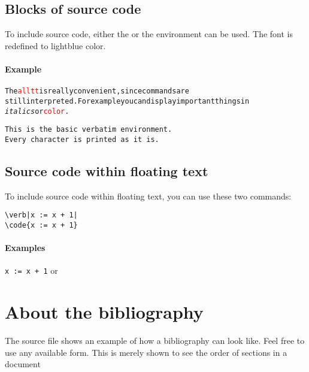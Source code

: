 \documentclass{jotarticle}
\begin{document}
\subsection{Blocks of source code}

To include source code, either the  or the 
environment can be used. The font is redefined to lightblue color.

\paragraph{Example}
\begin{alltt}
The \textcolor{red}{alltt} is really convenient, since commands are 
still interpreted. For example you can display important things in 
\textit{italics} or \textcolor{red}{color}.
\end{alltt}

\begin{verbatim}
This is the basic verbatim environment. 
Every character is printed as it is.
\end{verbatim}


\subsection{Source code within floating text}

To include source code within floating text, you can use these
two commands:

\begin{verbatim}
\verb|x := x + 1|
\code{x := x + 1}
\end{verbatim}

\paragraph{Examples} \verb|x := x + 1| or 



\section{About the bibliography}

The source file shows an example of how a bibliography can look like.
Feel free to use any available form. This is merely shown to see the
order of sections in a document


\end{document}

